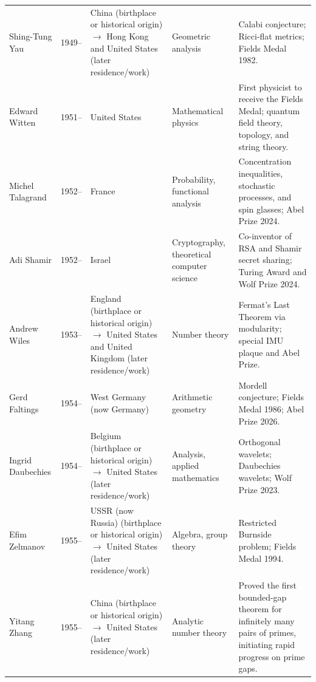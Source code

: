 {\begin{longtable}{@{}L{0.145\textwidth}L{0.09\textwidth}L{0.225\textwidth}L{0.14\textwidth}L{0.30\textwidth}@{}}
        Shing-Tung Yau
        & 1949--
        & China (birthplace or historical origin) \(\to\) Hong Kong and United States (later residence/work)
        & Geometric analysis
        & Calabi conjecture; Ricci-flat metrics; Fields Medal 1982. \\

        Edward Witten
        & 1951--
        & United States
        & Mathematical physics
        & First physicist to receive the Fields Medal; quantum field theory,
          topology, and string theory. \\

        Michel Talagrand
        & 1952--
        & France
        & Probability, functional analysis
        & Concentration inequalities, stochastic processes, and spin glasses;
          Abel Prize 2024. \\

        Adi Shamir
        & 1952--
        & Israel
        & Cryptography, theoretical computer science
        & Co-inventor of RSA and Shamir secret sharing; Turing Award and Wolf
          Prize 2024. \\

        Andrew Wiles
        & 1953--
        & England (birthplace or historical origin) \(\to\) United States and United Kingdom (later residence/work)
        & Number theory
        & Fermat's Last Theorem via modularity; special IMU plaque and Abel
          Prize. \\

        Gerd Faltings
        & 1954--
        & West Germany (now Germany)
        & Arithmetic geometry
        & Mordell conjecture; Fields Medal 1986; Abel Prize 2026. \\

        Ingrid Daubechies
        & 1954--
        & Belgium (birthplace or historical origin) \(\to\) United States (later residence/work)
        & Analysis, applied mathematics
        & Orthogonal wavelets; Daubechies wavelets; Wolf Prize 2023. \\

        Efim Zelmanov
        & 1955--
        & USSR (now Russia) (birthplace or historical origin) \(\to\) United States (later residence/work)
        & Algebra, group theory
        & Restricted Burnside problem; Fields Medal 1994. \\

        Yitang Zhang
        & 1955--
        & China (birthplace or historical origin) \(\to\) United States (later residence/work)
        & Analytic number theory
        & Proved the first bounded-gap theorem for infinitely many pairs of
          primes, initiating rapid progress on prime gaps. \\


\end{longtable}}
